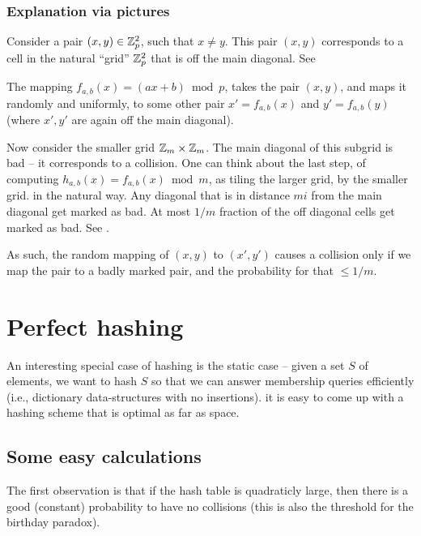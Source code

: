 \subsubsection{Explanation via pictures}

Consider a pair $(x,y)\in \mathbb{Z}_p^2$, such that $x \neq y$. This pair
$(x,y)$ corresponds to a cell in the natural ``grid'' $\mathbb{Z}_p^2$ that
is off the main diagonal.  See 


The mapping $f_{a,b}(x) = (ax + b) \bmod p$, takes the pair $(x,y)$,
and maps it randomly and uniformly, to some other pair
$x' = f_{a,b}(x)$ and $y' = f_{a,b}(y)$ (where $x', y'$ are again off
the main diagonal).

Now consider the smaller grid $\mathbb{Z}_m \times \mathbb{Z}_m$. The main diagonal
of this \si{subgrid} is bad -- it corresponds to a collision. One can
think about the last step, of computing
$h_{a,b}(x) = f_{a,b}(x) \bmod m$, as tiling the larger grid, by the
smaller grid. in the natural way. Any diagonal that is in distance
$mi$ from the main diagonal get marked as bad. At most $1/m$ fraction
of the off diagonal cells get marked as bad.
See    .

As such, the random mapping of $(x,y)$ to $(x',y')$ causes a collision
only if we map the pair to a badly marked pair, and the probability
for that $\leq 1/m$. 





\section{Perfect hashing}%


An interesting special case of hashing is the static case -- given a
set $S$ of elements, we want to hash $S$ so that we can answer
membership queries efficiently (i.e., dictionary data-structures with
no insertions). it is easy to come up with a hashing scheme that is
optimal as far as space.

\subsection{Some easy calculations}

The first observation is that if the hash table is quadraticly large,
then there is a good (constant) probability to have no collisions
(this is also the threshold for the birthday paradox).

